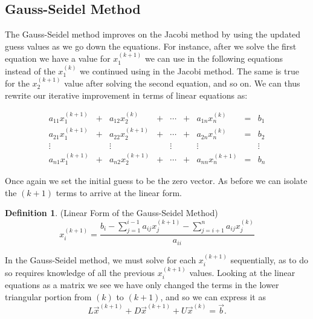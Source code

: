 \documentclass[12pt,letterpaper]{article}
\theoremstyle{definition}
\newtheorem{defn}[thm]{Definition}
\begin{document}
\subsection{Gauss-Seidel Method}
The Gauss-Seidel method improves on the Jacobi method by using the updated guess values as we go down the equations. For instance, after we solve the first equation we have a value for $x_1^{(k+1)}$ we can use in the following equations instead of the $x_1^{(k)}$ we continued using in the Jacobi method. The same is true for the $x_2^{(k+1)}$ value after solving the second equation, and so on. We can thus rewrite our iterative improvement in terms of linear equations as\cite{Strong05}:

\begin{equation}
    \begin{matrix}
    a_{11}x_1^{(k+1)}&+&a_{12}x_2^{(k)}&+&\cdots&+&a_{1n}x_n^{(k)}&=&b_1\\
    a_{21}x_1^{(k+1)}&+&a_{22}x_2^{(k+1)}&+&\cdots&+&a_{2n}x_n^{(k)}&=&b_2\\
    \vdots &&\vdots &&\vdots &&\vdots&&\vdots\\
    a_{n1}x_1^{(k+1)}&+&a_{n2}x_2^{(k+1)}&+&\cdots&+&a_{nn}x_n^{(k+1)}&=&b_n
    \end{matrix}
\end{equation}

\noindent Once again we set the initial guess to be the zero vector. As before we can isolate the $(k+1)$ terms to arrive at the linear form.

\begin{defn}{(Linear Form of the Gauss-Seidel Method)}
\begin{equation*}
    x_i^{(k+1)} = \frac{b_i-\sum\limits_{j=1}^{i-1}a_{ij}x_j^{(k+1)}-\sum\limits_{j=i+1}^{n}a_{ij}x_j^{(k)}}{a_{ii}}
\end{equation*}
\end{defn}

In the Gauss-Seidel method, we must solve for each $x_i^{(k+1)}$ sequentially, as to do so requires knowledge of all the previous $x_i^{(k+1)}$ values. Looking at the linear equations as a matrix we see we have only changed the terms in the lower triangular portion from $(k)$ to $(k+1)$, and so we can express it as $$L\vec{x}^{(k+1)}+D\vec{x}^{(k+1)}+U\vec{x}^{(k)}=\vec{b}.$$ 
\end{document}
